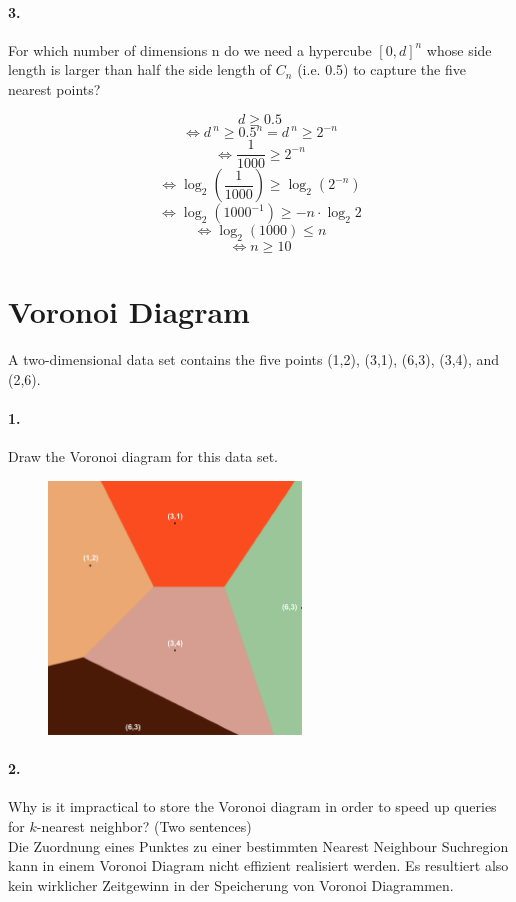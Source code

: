 \documentclass[a4paper,11pt,twoside]{scrartcl}
\begin{document}
\paragraph*{3.}  For which number of dimensions n do we need a hypercube $[0,d]^n$ whose side length is larger than half  the side length of $C_n$ (i.e. 0.5) to capture the five nearest points?

\[d \geq 0.5 \]
\[\Leftrightarrow d^{\:n} \geq 0.5^n = d^{\:n} \geq 2^{-n}  \]
\[\Leftrightarrow \frac{1}{1000} \geq 2^{-n} \]
\[\Leftrightarrow \log_2{\left(\frac{1}{1000}\right)} \geq \log_2{(2^{-n})} \]
\[\Leftrightarrow \log_2{\left(1000^{-1}\right)} \geq -n \cdot \log_2{2} \]
\[\Leftrightarrow \log_2{\left(1000\right)} \leq n \]
\[\Leftrightarrow n \geq 10 \]

\pagebreak

\section*{Voronoi Diagram}

A two-dimensional data set contains the five points (1,2), (3,1), (6,3), (3,4), and (2,6).
\paragraph*{1.} Draw the Voronoi diagram for this data set.
\begin{figure}[H]
\center
\includegraphics[width=0.6\textwidth]{images/voronoi_diagram.png}
\end{figure}



\paragraph*{2.} Why is it impractical to store the Voronoi diagram in order to speed up queries for $k$-nearest neighbor? (Two sentences) \\

Die Zuordnung eines Punktes zu einer bestimmten Nearest Neighbour Suchregion kann in einem Voronoi Diagram nicht effizient realisiert werden. Es resultiert also kein wirklicher Zeitgewinn in der Speicherung von Voronoi Diagrammen.
\end{document}
